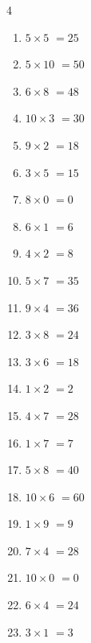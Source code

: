 \begin{multicols}{4}
\begin{enumerate}
  \item $5\times 5$
        $=25$

  \item $5\times 10$
        $=50$

  \item $6\times 8$
        $=48$

  \item $10\times 3$
        $=30$

  \item $9\times 2$
        $=18$

  \item $3\times 5$
        $=15$

  \item $8\times 0$
        $=0$

  \item $6\times 1$
        $=6$

  \item $4\times 2$
        $=8$

  \item $5\times 7$
        $=35$

  \item $9\times 4$
        $=36$

  \item $3\times 8$
        $=24$

  \item $3\times 6$
        $=18$

  \item $1\times 2$
        $=2$

  \item $4\times 7$
        $=28$

  \item $1\times 7$
        $=7$

  \item $5\times 8$
        $=40$

  \item $10\times 6$
        $=60$

  \item $1\times 9$
        $=9$

  \item $7\times 4$
        $=28$

  \item $10\times 0$
        $=0$

  \item $6\times 4$
        $=24$

  \item $3\times 1$
        $=3$


\end{enumerate}
\end{multicols}
